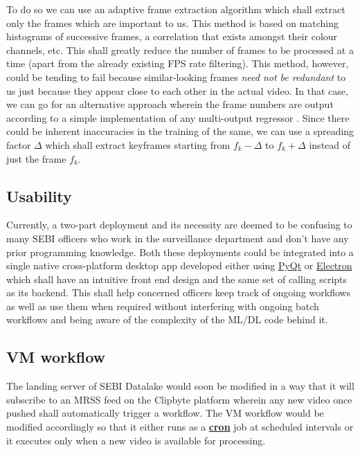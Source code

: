 To do so we can use an adaptive frame extraction algorithm
\cite{adapt} which shall extract only the frames which are important
to us. This method is based on matching histograms of successive
frames, a correlation that exists amongst their colour channels, etc.
This shall greatly reduce the number of frames to be processed at a
time (apart from the already existing FPS rate filtering). This
method, however, could be tending to fail because similar-looking
frames \textit{need not be redundant} to us just because they appear
close to each other in the actual video. In that case, we can go for
an alternative approach wherein the frame numbers are output
according to a simple implementation of any multi-output regressor
\cite{Brownlee2020}. Since there could be inherent inaccuracies in
the training of the same, we can use a spreading factor $\Delta$
which shall extract keyframes starting from ${f}_{k} - \Delta$ to
${f}_{k} + \Delta$ instead of just the frame $f_k$.

\subsection{Usability}

Currently, a two-part deployment and its necessity are deemed to be
confusing to many SEBI officers who work in the surveillance
department and don’t have any prior programming knowledge. Both these
deployments could be integrated into a single native cross-platform
desktop app developed either using
\href{https://riverbankcomputing.com/software/pyqt/intro}{PyQt} or
\href{electronjs.org}{Electron} which shall have an intuitive front
end design and the same set of calling scripts as its backend. This
shall help concerned officers keep track of ongoing workflows as well
as use them when required without interfering with ongoing batch
workflows and being aware of the complexity of the ML/DL code behind it.

\subsection{VM workflow} \label{future}

The landing server of SEBI Datalake would soon be modified in a way
that it will subscribe to an MRSS feed on the Clipbyte platform
wherein any new video once pushed shall automatically trigger a
workflow. The VM workflow would be modified accordingly so that it
either runs as a
\href{https://en.wikipedia.org/wiki/Cron}{\textbf{cron}} job at
scheduled intervals or it executes only when a new video is available
for processing.
